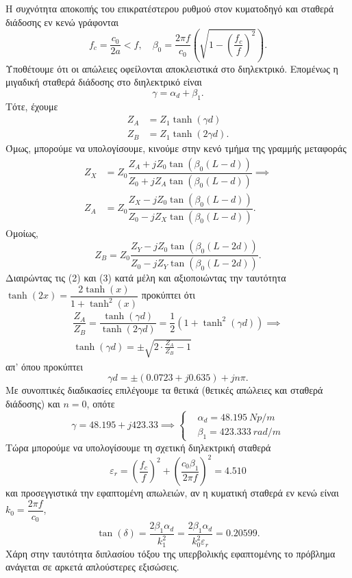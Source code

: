 \documentclass[12pt]{article}
\begin{document}
Η συχνότητα αποκοπής του επικρατέστερου ρυθμού στον κυματοδηγό και σταθερά διάδοσης εν κενώ γράφονται
\begin{equation}
    f_c = \dfrac{c_0}{2a} < f, \quad \beta_0 = \dfrac{2\pi f }{c_0}\left(\sqrt{1 - \left(\dfrac{f_c}{f}\right)^2}\right). 
\end{equation}
Υποθέτουμε ότι οι απώλειες οφείλονται αποκλειστικά στο διηλεκτρικό. Επομένως η μιγαδική σταθερά διάδοσης στο διηλεκτρικό είναι 
\begin{equation*}
    \gamma = \alpha_d + \beta_1. 
\end{equation*}
Τότε, έχουμε 
\begin{align}
    Z_A &= Z_1 \tanh (\gamma d) \\ 
    Z_B &= Z_1 \tanh (2\gamma d). 
\end{align} 
Όμως, μπορούμε να υπολογίσουμε, κινούμε στην κενό τμήμα της γραμμής μεταφοράς 
\begin{align}
    Z_X &= Z_0 \dfrac{Z_A + jZ_0\tan(\beta_0(L - d))}{Z_0 + jZ_A\tan(\beta_0(L -d ))} \implies \\
    Z_A &= Z_0 \dfrac{Z_X - jZ_0\tan(\beta_0(L - d))}{Z_0 - jZ_X\tan(\beta_0(L -d ))}. 
\end{align}
Ομοίως, 
\begin{equation}
    Z_B = Z_0 \dfrac{Z_Y - jZ_0\tan(\beta_0(L - 2d))}{Z_0 - jZ_Y\tan(\beta_0(L -2d ))}. 
\end{equation}
Διαιρώντας τις (2) και (3) κατά μέλη και αξιοποιώντας την ταυτότητα \(\tanh(2x) = \dfrac{2\tanh(x )}{1 + \tanh ^2(x)}\) προκύπτει ότι 
\begin{gather}
    \dfrac{Z_A }{Z_B } = \dfrac{\tanh(\gamma d )}{\tanh(2 \gamma d )} = \dfrac{1 }{2 }(1 + \tanh^2(\gamma d)) \implies \\ 
    \tanh(\gamma d) = \pm \sqrt{2\cdot\frac{Z_A }{Z_B } - 1}
\end{gather}
απ' όπου προκύπτει 
\begin{equation}
    \gamma d = \pm(0.0723 + j0.635) + jn\pi. 
\end{equation}
Με συνοπτικές διαδικασίες επιλέγουμε τα θετικά (θετικές απώλειες και σταθερά διάδοσης) και \(n = 0\), οπότε 
\[
    \gamma = 48.195 + j423.33 \implies 
     \left\{   \begin{aligned}
            & \alpha_d = \SI{48.195}{Np/m} \\ 
            & \beta_1 = \SI{423.333}{rad/m}
        \end{aligned}
    \right.
\]
Τώρα μπορούμε να υπολογίσουμε τη σχετική διηλεκτρική σταθερά
\begin{equation}
    \varepsilon_r = \left(\dfrac{f_c}{f}\right)^2 + \left(\dfrac{c_0 \beta_1}{2\pi f}\right)^2 = 4.510
\end{equation}
και προσεγγιστικά την εφαπτομένη απωλειών, αν η κυματική σταθερά εν κενώ είναι \(k_0 = \dfrac{2\pi f }{c_0}\), 
\begin{equation}
    \tan(\delta) = \dfrac{2\beta_1 \alpha_d }{k_1^2 } = \dfrac{2\beta_1 \alpha_d }{k_0^2\varepsilon_r } = 0.20599. 
\end{equation}
Χάρη στην ταυτότητα διπλασίου τόξου της υπερβολικής εφαπτομένης το πρόβλημα ανάγεται σε αρκετά απλούστερες εξισώσεις. \\
\end{document}
